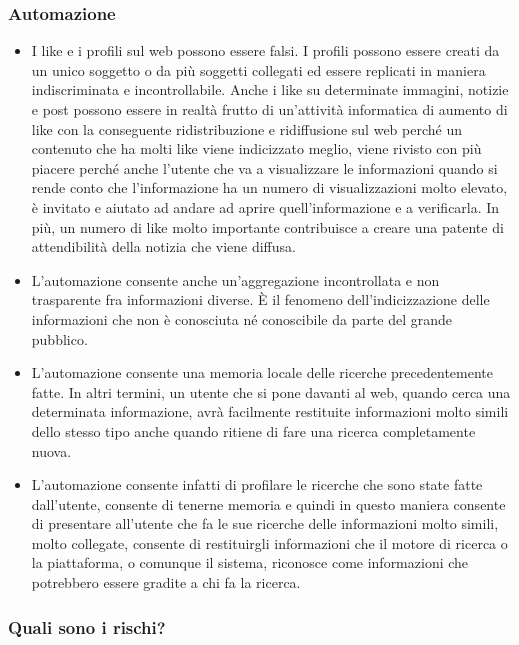 \subsubsection{Automazione}
\begin{itemize}
    \item I like e i profili sul web possono essere falsi. I profili possono essere creati da un unico soggetto o da più soggetti collegati ed essere replicati in maniera indiscriminata e incontrollabile. Anche i like su determinate immagini, notizie e post possono essere in realtà frutto di un'attività informatica di aumento di like con la conseguente ridistribuzione e ridiffusione sul web perché un contenuto che ha molti like viene indicizzato meglio, viene rivisto con più piacere perché anche l'utente che va a visualizzare le informazioni quando si rende conto che l'informazione ha un numero di visualizzazioni molto elevato, è invitato e aiutato ad andare ad aprire quell'informazione e a verificarla. In più, un numero di like molto importante contribuisce a creare una patente di attendibilità della notizia che viene diffusa.
    \item L'automazione consente anche un'aggregazione incontrollata e non trasparente fra informazioni diverse. È il fenomeno dell'indicizzazione delle informazioni che non è conosciuta né conoscibile da parte del grande pubblico.
    \item L'automazione consente una memoria locale delle ricerche precedentemente fatte. In altri termini, un utente che si pone davanti al web, quando cerca una determinata informazione, avrà facilmente restituite informazioni molto simili dello stesso tipo anche quando ritiene di fare una ricerca completamente nuova.
    \item L'automazione consente infatti di profilare le ricerche che sono state fatte dall'utente, consente di tenerne memoria e quindi in questo maniera consente di presentare all'utente che fa le sue ricerche delle informazioni molto simili, molto collegate, consente di restituirgli informazioni che il motore di ricerca o la piattaforma, o comunque il sistema, riconosce come informazioni che potrebbero essere gradite a chi fa la ricerca.
\end{itemize}

\subsubsection{Quali sono i rischi?}


